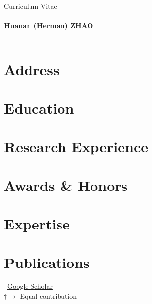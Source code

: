 \documentclass[11pt]{article} %
\newcommand{\mytitle}[1]{
  \begin{center}
    Curriculum Vitae\\
    \hspace{4pt} \\ %
    \Large\textbf{#1}\normalsize \\
    \hspace{4pt} \\ %
  \end{center}
}
\begin{document}
\mytitle{Huanan (Herman) ZHAO}
\RaggedRight



\section*{Address}


% 

\section*{Education}


\section*{Research Experience}
\label{exp_research}


\section*{Awards \& Honors}
\label{awards}


\section*{Expertise}
\label{expertise}




\section*{Publications}
\label{pubs}

\vspace{-.75em}
\small
\faGoogle~\href{https://scholar.google.com/citations?user=ojSVoWQAAAAJ}{Google Scholar}\\
$\dagger \rightarrow$ Equal contribution
\normalsize
\end{document}
